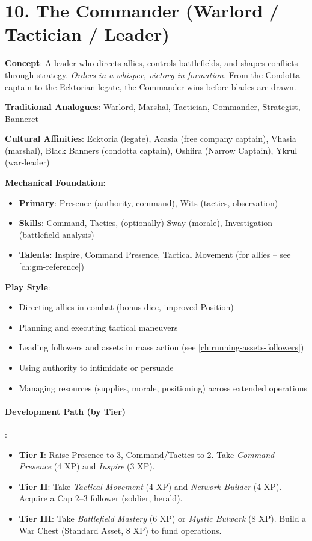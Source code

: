 \section{10. The Commander (Warlord / Tactician / Leader)}
\label{sec:concept-commander}

\textbf{Concept}: A leader who directs allies, controls battlefields, and shapes conflicts through strategy. \emph{Orders in a whisper, victory in formation.} From the Condotta captain to the Ecktorian legate, the Commander wins before blades are drawn.

\textbf{Traditional Analogues}: Warlord, Marshal, Tactician, Commander, Strategist, Banneret

\textbf{Cultural Affinities}: Ecktoria (legate), Acasia (free company captain), Vhasia (marshal), Black Banners (condotta captain), Oshiira (Narrow Captain), Ykrul (war-leader)

\textbf{Mechanical Foundation}:
\begin{itemize}
\item \textbf{Primary}: Presence (authority, command), Wits (tactics, observation)
\item \textbf{Skills}: Command, Tactics, (optionally) Sway (morale), Investigation (battlefield analysis)
\item \textbf{Talents}: Inspire, Command Presence, Tactical Movement (for allies -- see \ref{ch:gm-reference})
\end{itemize}

\textbf{Play Style}:
\begin{itemize}
\item Directing allies in combat (bonus dice, improved Position)
\item Planning and executing tactical maneuvers
\item Leading followers and assets in mass action (see \ref{ch:running-assets-followers})
\item Using authority to intimidate or persuade
\item Managing resources (supplies, morale, positioning) across extended operations
\end{itemize}

\paragraph{Development Path (by Tier)}:
\begin{itemize}
\item \textbf{Tier I}: Raise Presence to 3, Command/Tactics to 2. Take \emph{Command Presence} (4 XP) and \emph{Inspire} (3 XP).
\item \textbf{Tier II}: Take \emph{Tactical Movement} (4 XP) and \emph{Network Builder} (4 XP). Acquire a Cap 2--3 follower (soldier, herald).
\item \textbf{Tier III}: Take \emph{Battlefield Mastery} (6 XP) or \emph{Mystic Bulwark} (8 XP). Build a War Chest (Standard Asset, 8 XP) to fund operations.
\end{itemize}

